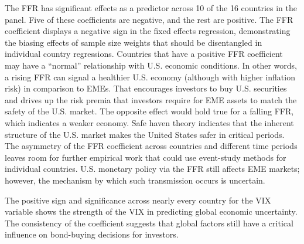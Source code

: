 \documentclass[12pt]{article}
\begin{document}
The FFR has significant effects as a predictor across 10 of the 16 countries in the panel. Five of these coefficients are negative, and the rest are positive. The FFR coefficient displays a negative sign in the fixed effects regression, demonstrating the biasing effects of sample size weights that should be disentangled in individual country regressions. Countries that have a positive FFR coefficient may have a ``normal'' relationship with U.S. economic conditions. In other words, a rising FFR can signal a healthier U.S. economy (although with higher inflation risk) in comparison to EMEs. That encourages investors to buy U.S. securities and drives up the risk premia that investors require for EME assets to match the safety of the U.S. market. The opposite effect would hold true for a falling FFR, which indicates a weaker economy. Safe haven theory indicates that the inherent structure of the U.S. market makes the United States safer in critical periods. The asymmetry of the FFR coefficient across countries and different time periods leaves room for further empirical work that could use event-study methods for individual countries. U.S. monetary policy via the FFR still affects EME markets; however, the mechanism by which such transmission occurs is uncertain.

The positive sign and significance across nearly every country for the VIX variable shows the strength of the VIX in predicting global economic uncertainty. The consistency of the coefficient suggests that global factors still have a critical influence on bond-buying decisions for investors.
\end{document}
